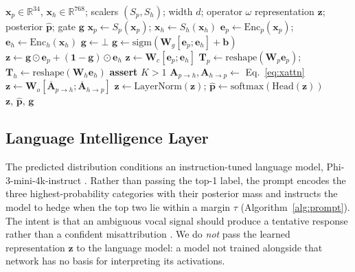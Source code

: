 \documentclass[journal,onecolumn,11pt,draftclsnofoot]{IEEEtran}   %
\begin{document}
\begin{algorithm}[!t]
\caption{Unified psychoacoustic--semantic representation}
\label{alg:unified}
\begin{algorithmic}[1]
\Require $\mathbf{x}_p \in \mathbb{R}^{34}$, $\mathbf{x}_h \in \mathbb{R}^{768}$;
         scalers $(S_p,S_h)$; width $d$; operator $\omega$
\Ensure representation $\mathbf{z}$; posterior $\hat{\mathbf{p}}$; gate
        $\mathbf{g}$
\State $\mathbf{x}_p \gets S_p(\mathbf{x}_p)$; \;
       $\mathbf{x}_h \gets S_h(\mathbf{x}_h)$
\State $\mathbf{e}_p \gets \mathrm{Enc}_p(\mathbf{x}_p)$; \;
       $\mathbf{e}_h \gets \mathrm{Enc}_h(\mathbf{x}_h)$
\State $\mathbf{g} \gets \bot$
  \State $\mathbf{g} \gets \mathrm{sigm}(\mathbf{W}_g[\mathbf{e}_p;
         \mathbf{e}_h]+\mathbf{b})$
  \State $\mathbf{z} \gets \mathbf{g}\odot\mathbf{e}_p +
         (\mathbf{1}-\mathbf{g})\odot\mathbf{e}_h$
  \State $\mathbf{z} \gets \mathbf{W}_c[\mathbf{e}_p;\mathbf{e}_h]$
\Else
  \State $\mathbf{T}_p \gets \mathrm{reshape}(\mathbf{W}_p\mathbf{e}_p)$; \;
         $\mathbf{T}_h \gets \mathrm{reshape}(\mathbf{W}_h\mathbf{e}_h)$
  \State \textbf{assert} $K > 1$
  \State $\mathbf{A}_{p\rightarrow h},\mathbf{A}_{h\rightarrow p} \gets$
         Eq.~\eqref{eq:xattn}
  \State $\mathbf{z} \gets \mathbf{W}_o[\overline{\mathbf{A}}_{p\rightarrow h};
         \overline{\mathbf{A}}_{h\rightarrow p}]$
\EndIf
\State $\mathbf{z} \gets \mathrm{LayerNorm}(\mathbf{z})$;\;
       $\hat{\mathbf{p}} \gets \mathrm{softmax}(\mathrm{Head}(\mathbf{z}))$
\State \Return $\mathbf{z},\, \hat{\mathbf{p}},\, \mathbf{g}$
\end{algorithmic}
\end{algorithm}

\subsection{Language Intelligence Layer}
\label{sec:llm}
The predicted distribution conditions an instruction-tuned language model,
Phi-3-mini-4k-instruct \cite{abdin2024phi3}. Rather than passing the top-1
label, the prompt encodes the three highest-probability categories with their
posterior mass and instructs the model to hedge when the top two lie within a
margin $\tau$ (Algorithm~\ref{alg:prompt}). The intent is that an ambiguous
vocal signal should produce a tentative response rather than a confident
misattribution \cite{tian2023calibration,wen2025abstention}. We do \emph{not}
pass the learned representation $\mathbf{z}$ to the language model: a model not
trained alongside that network has no basis for interpreting its activations.
\end{document}
